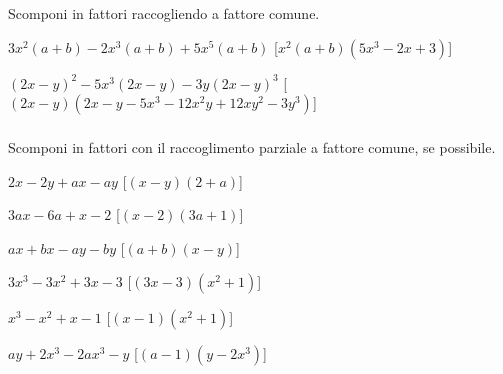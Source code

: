 \begin{esercizio}[\Ast]
Scomponi in fattori raccogliendo a fattore comune.
\label{ese:div.012}
 \begin{enumeratea}
 \item $3x^{2}(a+b)-2x^{3}(a+b)+5x^{5}(a+b)$
   \hfill [$x^{2}(a+b)(5x^{3}-2x+3)$]
 \item $(2x-y)^{2}-5x^{3}(2x-y)-3y(2x-y)^{3}$
   \hfill [$(2x-y)\left(2x-y-5x^3-12x^2y+12xy^2-3y^3\right)$]
\end{enumeratea}
\end{esercizio}

\subsubsection*{}

\begin{esercizio}[\Ast]
\label{ese:div.013}
Scomponi in fattori con il raccoglimento parziale a fattore comune, se possibile.
\begin{multicols}{2}
 \begin{enumeratea}
 \item $2x-2y+ax-ay$ \hfill [$(x-y)(2+a)$]
 \item $3ax-6a+x-2$ \hfill [$(x-2)(3a+1)$]
 \item $ax+bx-ay-by$ \hfill [$(a+b)(x-y)$]
 \item $3x^{3}-3x^{2}+3x-3$ \hfill [$(3x-3)\left(x^2+1\right)$]
 \item $x^{3}-x^{2}+x-1$ \hfill [$(x-1)\left(x^{2}+1\right)$]
 \item $ay+2x^{3}-2ax^{3}-y$ \hfill [$(a-1)\left(y-2x^{3}\right)$]
\end{enumeratea}
\end{multicols}
\end{esercizio}

